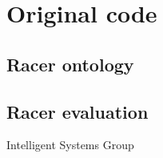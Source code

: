 \documentclass[a4paper,12pt]{report}
\begin{document}
\clearpage
\appendix

\chapter{Original code}
\section{Racer ontology}



\section{Racer evaluation}




\vspace{2cm}
\begin{center}
Intelligent Systems Group\\
\end{center}
\end{document}

